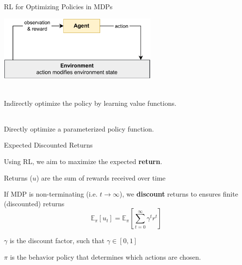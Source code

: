 \begin{frame}{RL for Optimizing Policies in MDPs}

        \centering
        \includegraphics[width=0.6\textwidth]{images/chapter_2/RL-loop.pdf}

	\vspace{2em}

    \bcol
             \\
            Indirectly optimize the policy by learning value functions.

             \\
            Directly optimize a parameterized policy function.
    
    \ecol
    
\end{frame}

\begin{frame}{Expected Discounted Returns}

    Using RL, we aim to maximize the expected \textbf{return}.

    \blist
        \item Returns ($u$) are the sum of rewards received over time
        \item If MDP is non-terminating (i.e. $t \to \infty$), we \textbf{discount} returns to ensures finite (discounted) returns
    \elist
    \vspace{0pt}
    $$
    \mathbb{E}_{\pi}[u_{t}] = \mathbb{E}_{\pi}\left[\sum_{t=0}^{\infty}\gamma^t r^t\right]
    $$

    \blist
        \item $\gamma$ is the discount factor, such that $\gamma \in [0, 1]$
        \item $\pi$ is the behavior policy that determines which actions are chosen.
    \elist
\end{frame}


